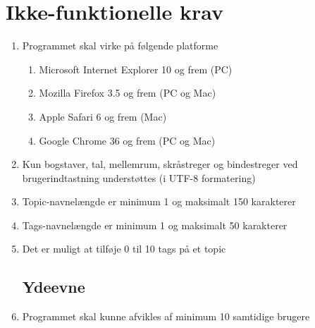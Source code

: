 \section{Ikke-funktionelle krav}
\begin{enumerate}
	\subsection*{Brugbarhed}
	\item Programmet skal virke på følgende platforme
	\begin{enumerate}
		\item Microsoft Internet Explorer 10 og frem (PC)
		\item Mozilla Firefox 3.5 og frem (PC og Mac)
		\item Apple Safari 6 og frem (Mac)
		\item Google Chrome 36 og frem (PC og Mac)
	\end{enumerate}
	
	\item Kun bogstaver, tal, mellemrum, skråstreger og bindestreger ved brugerindtastning understøttes (i UTF-8 formatering)
	\item Topic-navnelængde er minimum 1 og maksimalt 150 karakterer
	\item Tags-navnelængde er minimum 1 og maksimalt 50 karakterer 
	\item Det er muligt at tilføje 0 til 10 tags på et topic
	\subsection*{Ydeevne}
	\item Programmet skal kunne afvikles af minimum 10 samtidige brugere
\end{enumerate}